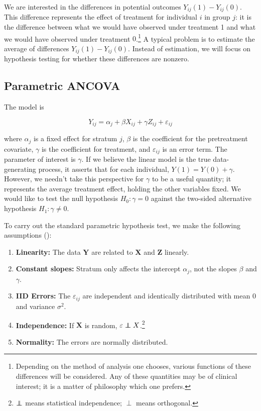 \documentclass[11pt]{article}
\newcommand{\eps}{\varepsilon}
\newcommand\independent{\protect\mathpalette{\protect\independenT}{\perp}}
\def\independenT#1#2{\mathrel{\rlap{$#1#2$}\mkern2mu{#1#2}}}
\begin{document}
We are interested in the differences in potential outcomes $Y_{ij}(1) - Y_{ij}(0)$.
This difference represents the effect of treatment for individual $i$ in group $j$: it is the difference between what we would have observed under treatment 1 and what we would have observed under treatment $0$.\footnote{
Depending on the method of analysis one chooses, various functions of these differences will be considered.
Any of these quantities may be of clinical interest; it is a matter of philosophy which one prefers.}
A typical problem is to estimate the average of differences $Y_{ij}(1) - Y_{ij}(0)$.
Instead of estimation, we will focus on hypothesis testing for whether these differences are nonzero.

\subsection{Parametric ANCOVA}

The model is

\begin{equation}\label{eqn:ancova}
Y_{ij} = \alpha_j + \beta X_{ij} + \gamma Z_{ij} + \eps_{ij}
\end{equation}

\noindent where $\alpha_j$ is a fixed effect for stratum $j$, $\beta$ is the coefficient for the pretreatment covariate,
$\gamma$ is the coefficient for treatment,
and $\eps_{ij}$ is an error term.
The parameter of interest is $\gamma$. 
If we believe the linear model is the true data-generating process, it asserts that for each individual, $Y(1) = Y(0) + \gamma$.
However, we needn't take this perspective for $\gamma$ to be a useful quantity; it represents the average treatment effect, holding the other variables fixed.
We would like to test the null hypothesis $H_0: \gamma = 0$ against
the two-sided alternative hypothesis $H_1: \gamma \neq 0$.

To carry out the standard parametric hypothesis test, we make the following assumptions (\cite{freedman_statistical_2005}):

\begin{enumerate}
\item \textbf{Linearity:} The data $\mathbf{Y}$ are related to $\mathbf{X}$ and $\mathbf{Z}$ linearly.
\item \textbf{Constant slopes:} Stratum only affects the intercept $\alpha_j$, not the slopes $\beta$ and $\gamma$.
\item \textbf{IID Errors:} The $\eps_{ij}$ are independent and identically distributed with mean $0$ and variance $\sigma^2$.
\item \textbf{Independence:} If $\mathbf{X}$ is random, $\eps \independent X$.\footnote{$\independent$ means statistical independence; $\perp$ means orthogonal.}
\item \textbf{Normality:} The errors are normally distributed.
\end{enumerate}
\end{document}
